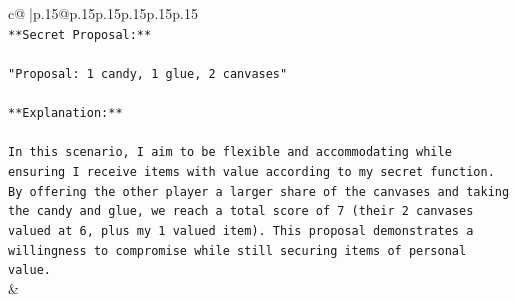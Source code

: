 \documentclass{article}
\begin{document}
{\begin{supertabular}{c@{$\;$}|p{.15\linewidth}@{}p{.15\linewidth}p{.15\linewidth}p{.15\linewidth}p{.15\linewidth}p{.15\linewidth}}
{{{\\ 
\texttt{**Secret Proposal:**} \\
\\ 
\texttt{"Proposal: 1 candy, 1 glue, 2 canvases"} \\
\\ 
\texttt{**Explanation:**} \\
\\ 
\texttt{In this scenario, I aim to be flexible and accommodating while ensuring I receive items with value according to my secret function. By offering the other player a larger share of the canvases and taking the candy and glue, we reach a total score of 7 (their 2 canvases valued at 6, plus my 1 valued item). This proposal demonstrates a willingness to compromise while still securing items of personal value.} \\
            }
        }
    }
    & \\ \\


\end{supertabular}}
\end{document}

